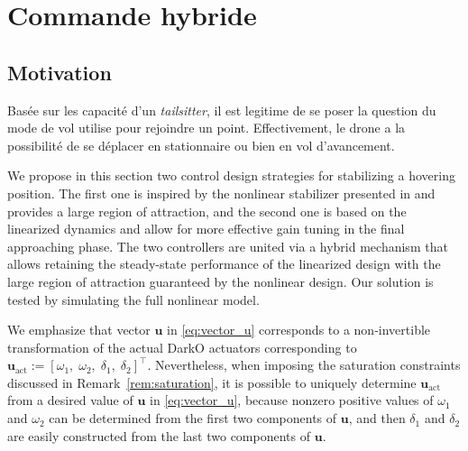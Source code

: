 \chapter{Commande hybride}
\minitoc


\section{Motivation}
Basée sur les capacité d'un \textit{tailsitter}, il est legitime de se poser la question du mode de vol utilise pour rejoindre un point. Effectivement, le drone a la possibilité de se déplacer en stationnaire ou bien en vol d'avancement.



We propose in this section two control design strategies for stabilizing a hovering position. The first one is inspired by the nonlinear stabilizer presented in \cite{2020e-MicCenZacFra} and provides a large region of attraction, and the second one is based on the linearized dynamics and allow for more effective gain tuning in the final approaching phase. The two controllers are united via a hybrid mechanism that allows retaining the steady-state performance of the linearized design with the large region of attraction guaranteed by the nonlinear design. Our solution is tested by simulating the full nonlinear model.

\begin{remark}\label{rem:control_inputs}
We emphasize that vector $\boldsymbol{u}$ in \eqref{eq:vector_u} corresponds to a non-invertible transformation of the actual DarkO actuators corresponding to $\boldsymbol{u}_{\text{act}} := [\omega_1,\; \omega_2,\; \delta_1,\; \delta_2]^\top$. Nevertheless, when imposing the saturation constraints discussed in Remark~\ref{rem:saturation}, it is possible to uniquely determine $\boldsymbol{u}_{\text{act}}$ from a desired value of $\boldsymbol{u}$ in \eqref{eq:vector_u}, because nonzero positive values of $\omega_1$ and $\omega_2$ can be determined from the first two components of $\boldsymbol{u}$, and then $\delta_1$ and $\delta_2$ are easily constructed from the last two components of $\boldsymbol{u}$. 
\end{remark}




